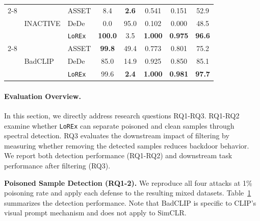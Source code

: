 \documentclass[letterpaper,twocolumn,10pt]{article}
\begin{document}
\begin{table}[!ht]
\begin{tabular}{lllccccc}
 \cmidrule(lr){2-8}
 & \multirow{3}{*}{INACTIVE}
   & ASSET & 8.4 & \textbf{2.6} & 0.541 & 0.151 & 52.9 \\
 & & DeDe & 0.0 & 95.0 & 0.102 & 0.000 & 48.5 \\
 & & \texttt{LoREx} & \textbf{100.0} & 3.5 & \textbf{1.000} & \textbf{0.975} & \textbf{96.6} \\
 \cmidrule(lr){2-8}
 & \multirow{3}{*}{BadCLIP}
   & ASSET & \textbf{99.8} & 49.4 & 0.773 & 0.801 & 75.2 \\
 & & DeDe & 85.0 & 14.9 & 0.925 & 0.850 & 85.1 \\
 & & \texttt{LoREx} & 99.6 & \textbf{2.4} & \textbf{1.000} & \textbf{0.981} & \textbf{97.7} \\
\bottomrule
\end{tabular}
\label{tab:detection_performance}
\end{table}

\paragraph{Evaluation Overview.}
In this section, we directly address research questions RQ1-RQ3. 
RQ1-RQ2 examine whether \texttt{LoREx} can separate poisoned and clean samples through spectral detection. 
RQ3 evaluates the downstream impact of filtering by measuring whether removing the detected samples reduces backdoor behavior. 
We report both detection performance (RQ1-RQ2) and downstream task performance after filtering (RQ3).


\par \textbf{Poisoned Sample Detection (RQ1-2).}
We reproduce all four attacks at 1\% poisoning rate and apply each defense to the resulting mixed datasets. Table~\ref{tab:detection_performance} summarizes the detection performance. Note that BadCLIP is specific to CLIP's visual prompt mechanism and does not apply to SimCLR.
\end{document}
